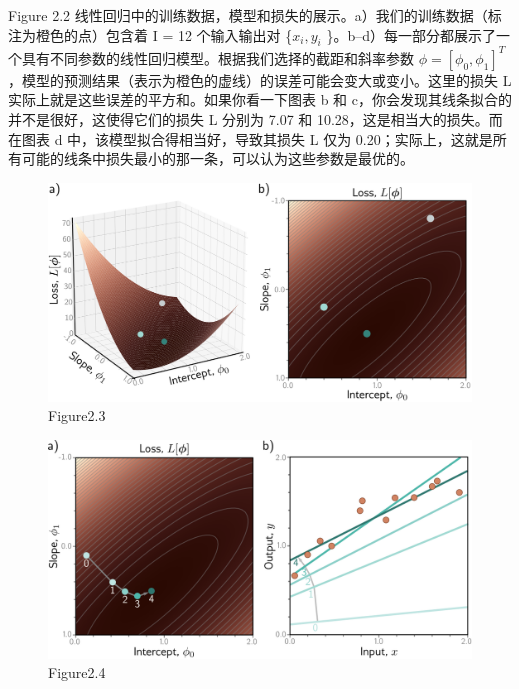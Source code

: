 \documentclass[
]{article}
\begin{document}
Figure 2.2
线性回归中的训练数据，模型和损失的展示。a）我们的训练数据（标注为橙色的点）包含着
I = 12 个输入输出对 \{\(x_i , y_i\)
\}。b--d）每一部分都展示了一个具有不同参数的线性回归模型。根据我们选择的截距和斜率参数
\(\phi = [\phi_0 , \phi_1 ]^T\)，模型的预测结果（表示为橙色的虚线）的误差可能会变大或变小。这里的损失
L 实际上就是这些误差的平方和。如果你看一下图表 b 和
c，你会发现其线条拟合的并不是很好，这使得它们的损失 L 分别为 7.07 和
10.28，这是相当大的损失。而在图表 d 中，该模型拟合得相当好，导致其损失 L
仅为
0.20；实际上，这就是所有可能的线条中损失最小的那一条，可以认为这些参数是最优的。

\begin{figure}
\centering
\includegraphics{figures/chapter2/SupervisedSurface.svg}
\caption{Figure2.3}
\end{figure}

\begin{figure}
\centering
\includegraphics{figures/chapter2/SupervisedOpt.svg}
\caption{Figure2.4}
\end{figure}
\end{document}
